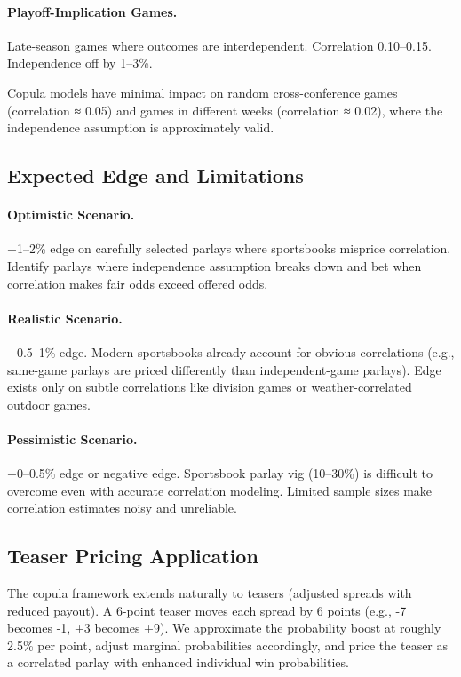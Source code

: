 \documentclass[12pt]{report}  %
\numberwithin{equation}{section}
\theoremstyle{plain}
\theoremstyle{definition}
\theoremstyle{remark}
\begin{document}
\paragraph{Playoff-Implication Games.}
Late-season games where outcomes are interdependent. Correlation 0.10--0.15. Independence off by 1--3\%.

Copula models have minimal impact on random cross-conference games (correlation ≈ 0.05) and games in different weeks (correlation ≈ 0.02), where the independence assumption is approximately valid.

\subsection{Expected Edge and Limitations}

\paragraph{Optimistic Scenario.}
+1--2\% edge on carefully selected parlays where sportsbooks misprice correlation. Identify parlays where independence assumption breaks down and bet when correlation makes fair odds exceed offered odds.

\paragraph{Realistic Scenario.}
+0.5--1\% edge. Modern sportsbooks already account for obvious correlations (e.g., same-game parlays are priced differently than independent-game parlays). Edge exists only on subtle correlations like division games or weather-correlated outdoor games.

\paragraph{Pessimistic Scenario.}
+0--0.5\% edge or negative edge. Sportsbook parlay vig (10--30\%) is difficult to overcome even with accurate correlation modeling. Limited sample sizes make correlation estimates noisy and unreliable.

\subsection{Teaser Pricing Application}
The copula framework extends naturally to teasers (adjusted spreads with reduced payout). A 6-point teaser moves each spread by 6 points (e.g., -7 becomes -1, +3 becomes +9). We approximate the probability boost at roughly 2.5\% per point, adjust marginal probabilities accordingly, and price the teaser as a correlated parlay with enhanced individual win probabilities.
\end{document}
